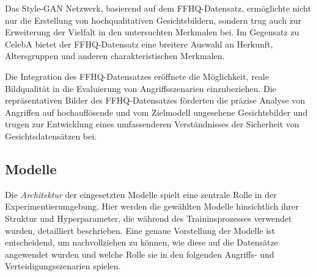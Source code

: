 Das Style-GAN Netzwerk, basierend auf dem FFHQ-Datensatz, ermöglichte nicht nur die Erstellung von hochqualitativen Gesichtsbildern, sondern trug auch zur Erweiterung der Vielfalt in den untersuchten Merkmalen bei. Im Gegensatz zu CelebA bietet der FFHQ-Datensatz eine breitere Auswahl an Herkunft, Altersgruppen und anderen charakteristischen Merkmalen.

Die Integration des FFHQ-Datensatzes eröffnete die Möglichkeit, reale Bildqualität in die Evaluierung von Angriffsszenarien einzubeziehen. Die repräsentativen Bilder des FFHQ-Datensatzes förderten die präzise Analyse von Angriffen auf hochauflösende und vom Zielmodell ungesehene Gesichtsbilder und trugen zur Entwicklung eines umfassenderen Verständnisses der Sicherheit von Gesichtsdatensätzen bei.

\subsection{Modelle}
Die \textit{Architektur} der eingesetzten Modelle spielt eine zentrale Rolle in der Experimentierumgebung. Hier werden die gewählten Modelle hinsichtlich ihrer Struktur und Hyperparameter, die während des Traininsprozesses verwendet wurden, detailliert beschrieben. Eine genaue Vorstellung der Modelle ist entscheidend, um nachvollziehen zu können, wie diese auf die Datensätze angewendet wurden und welche Rolle sie in den folgenden Angriffs- und Verteidigungsszenarien spielen.

